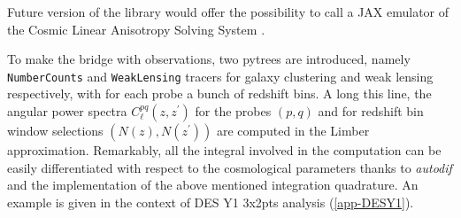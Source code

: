 \documentclass[twocolumn,twocolappendix,nofootinbib]{openjournal}
\begin{document}
Future version of the library would offer the possibility to call a JAX emulator of the Cosmic Linear Anisotropy Solving System \citep{2011JCAP...07..034B}.

To make the bridge with observations, two pytrees are introduced, namely \texttt{NumberCounts} and \texttt{WeakLensing} tracers for galaxy clustering and weak lensing  respectively,  with for each probe a bunch of redshift bins. A long this line, the angular power spectra $C_\ell^{pq}(z,z^\prime)$ for the probes $(p,q)$ and for redshift bin window selections $(N(z), N(z^\prime))$ are computed in the Limber approximation. 
Remarkably, all the integral involved in the computation can be easily differentiated with respect to the cosmological parameters thanks to \textit{autodif} and the implementation of the above mentioned integration quadrature.  An example is given in the context of DES Y1 3x2pts analysis (\ref{app-DESY1}).















\end{document}
